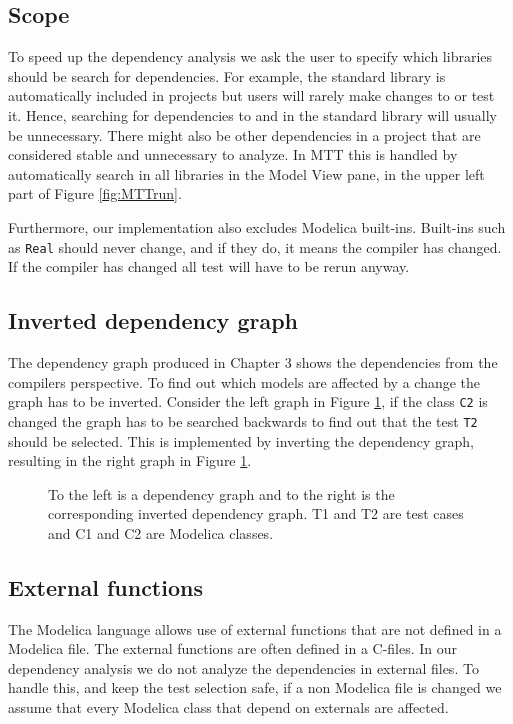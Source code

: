 \documentclass{cslthse-msc}
\begin{document}
\subsection{Scope}
To speed up the dependency analysis we ask the user to specify which libraries should be search for dependencies. For example, the standard library is automatically included in projects but users will rarely make changes to or test it. Hence, searching for dependencies to and in the standard library will usually be unnecessary. There might also be other dependencies in a project that are considered stable and unnecessary to analyze. In MTT this is handled by automatically search in all libraries in the Model View pane, in the upper left part of Figure \ref{fig:MTTrun}.

Furthermore, our implementation also excludes Modelica built-ins. Built-ins such as \texttt{Real} should never change, and if they do, it means the compiler has changed. If the compiler has changed all test will have to be rerun anyway.

\subsection{Inverted dependency graph}
The dependency graph produced in Chapter 3 shows the dependencies from the compilers perspective. To find out which models are affected by a change the graph has to be inverted. Consider the left graph in Figure \ref{fig:invertedGraph}, if the class \texttt{C2} is changed the graph has to be searched backwards to find out that the test \texttt{T2} should be selected. This is implemented by inverting the dependency graph, resulting in the right graph in Figure \ref{fig:invertedGraph}.

\begin{figure}[!htbp]
    \centering
    \qquad
    \caption{To the left is a dependency graph and to the right is the corresponding inverted dependency graph. T1 and T2 are test cases and C1 and C2 are Modelica classes.}
    \label{fig:invertedGraph}
\end{figure}

\subsection{External functions}
The Modelica language allows use of external functions that are not defined in a Modelica file. The external functions are often defined in a C-files\cite{modelicamodelica}. In our dependency analysis we do not analyze the dependencies in external files. To handle this, and keep the test selection safe, if a non Modelica file is changed we assume that every Modelica class that depend on externals are affected.
\end{document}
